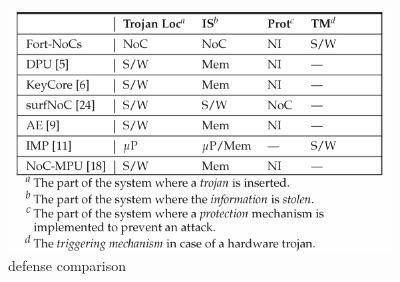 \documentclass[]{article}
\begin{document}
\begin{figure}
	\centering
	\includegraphics[width=4in]{img/defense-comparison.png}
	\caption{defense comparison}
\end{figure}
\end{document}

